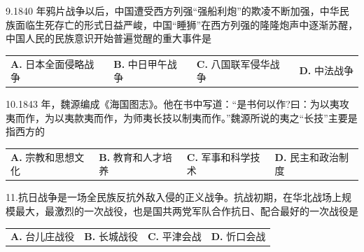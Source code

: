 \documentclass[UTF8,11pt]{ctexart}
\begin{document}
9.1840 年鸦片战争以后，中国遭受西方列强“强船利炮”的欺凌不断加强，中华民族面临生死存亡的形式日益严峻，中国“睡狮”在西方列强的隆隆炮声中逐渐苏醒，中国人民的民族意识开始普遍觉醒的重大事件是


\begin{center}\begin{tabular}{>{\raggedright\arraybackslash}p{\dimexpr(\linewidth-8\tabcolsep)/4\relax}>{\raggedright\arraybackslash}p{\dimexpr(\linewidth-8\tabcolsep)/4\relax}>{\raggedright\arraybackslash}p{\dimexpr(\linewidth-8\tabcolsep)/4\relax}>{\raggedright\arraybackslash}p{\dimexpr(\linewidth-8\tabcolsep)/4\relax}}
\textbf{A.} 日本全面侵略战争 & \textbf{B.} 中日甲午战争 & \textbf{C.} 八国联军侵华战争 & \textbf{D.} 中法战争\\[.35em]\end{tabular}\end{center}

10.1843 年，魏源编成《海国图志》。他在书中写道：“是书何以作?曰：为以夷攻夷而作，为以夷款夷而作，为师夷长技以制夷而作。”魏源所说的夷之“长技”主要是指西方的


\begin{center}\begin{tabular}{>{\raggedright\arraybackslash}p{\dimexpr(\linewidth-8\tabcolsep)/4\relax}>{\raggedright\arraybackslash}p{\dimexpr(\linewidth-8\tabcolsep)/4\relax}>{\raggedright\arraybackslash}p{\dimexpr(\linewidth-8\tabcolsep)/4\relax}>{\raggedright\arraybackslash}p{\dimexpr(\linewidth-8\tabcolsep)/4\relax}}
\textbf{A.} 宗教和思想文化 & \textbf{B.} 教育和人才培养 & \textbf{C.} 军事和科学技术 & \textbf{D.} 民主和政治制度\\[.35em]\end{tabular}\end{center}

11.抗日战争是一场全民族反抗外敌入侵的正义战争。抗战初期，在华北战场上规模最大，最激烈的一次战役，也是国共两党军队合作抗日、配合最好的一次战役是


\begin{center}\begin{tabular}{>{\raggedright\arraybackslash}p{\dimexpr(\linewidth-8\tabcolsep)/4\relax}>{\raggedright\arraybackslash}p{\dimexpr(\linewidth-8\tabcolsep)/4\relax}>{\raggedright\arraybackslash}p{\dimexpr(\linewidth-8\tabcolsep)/4\relax}>{\raggedright\arraybackslash}p{\dimexpr(\linewidth-8\tabcolsep)/4\relax}}
\textbf{A.} 台儿庄战役 & \textbf{B.} 长城战役 & \textbf{C.} 平津会战 & \textbf{D.} 忻口会战\\[.35em]\end{tabular}\end{center}
\end{document}
